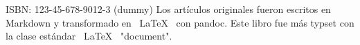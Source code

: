 \mbox{}
\vfill
ISBN: 123-45-678-9012-3 (dummy)
Los artículos originales fueron escritos en Markdown
y transformado en \ LaTeX \ con pandoc.
Este libro fue más typset con la clase estándar \ LaTeX \ "document".
\doclicenseThis
